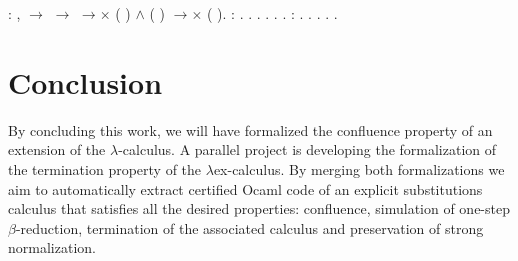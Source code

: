 \documentclass{llncs}
\begin{document}
\begin{coqdoccode}
\coqdocnoindent
{} : \coqdockw{\ensuremath{\forall}}  ,  \ensuremath{\rightarrow}  \ensuremath{\rightarrow}  \ensuremath{\rightarrow}\ensuremath{\times} ( ) \ensuremath{\land} ( ) \ensuremath{\rightarrow}\ensuremath{\times} ( ).\coqdoceol
\coqdocemptyline
\coqdocnoindent
{} :  .\coqdoceol
\coqdocnoindent
{}.\coqdoceol
\coqdocindent{1.00em}
 .\coqdoceol
\coqdocindent{1.00em}
\coqdoctac{\ensuremath{\exists}} .\coqdoceol
\coqdocindent{1.00em}
 .\coqdoceol
\coqdocnoindent
{}.\coqdoceol
\coqdocemptyline
\coqdocnoindent
{} :  .\coqdoceol
\coqdocnoindent
{}.\coqdoceol
\coqdocindent{1.00em}
 .\coqdoceol
\coqdocindent{1.00em}
 .\coqdoceol
\coqdocnoindent
{}.\coqdoceol
\end{coqdoccode}

\section{Conclusion}

By concluding this work, we will have formalized the confluence
property of an extension of the $\lambda$-calculus. A parallel project
is developing the formalization of the termination property of the
$\lambda$ex-calculus. By merging both formalizations we aim to
automatically extract certified Ocaml code of an explicit
substitutions calculus that satisfies all the desired properties:
confluence, simulation of one-step $\beta$-reduction, termination of
the associated calculus and preservation of strong normalization.




\end{document}
